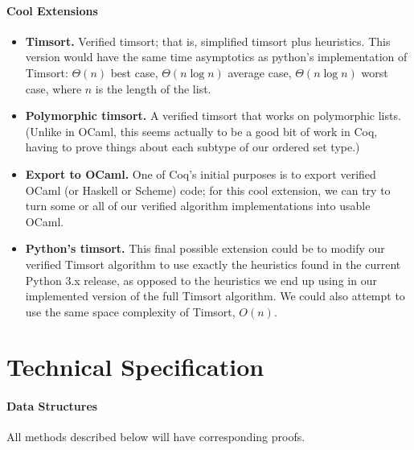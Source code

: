 \documentclass{article}
\begin{document}
\paragraph{Cool Extensions}
\begin{itemize}
  \item \textbf{Timsort.}
    Verified timsort; that is, simplified timsort plus heuristics.
    This version would have the same time asymptotics as python's
    implementation of Timsort:
    $\Theta(n)$ best case,
    $\Theta(n \log n)$ average case,
    $\Theta(n \log n)$ worst case,
    where $n$ is the length of the list.

  \item \textbf{Polymorphic timsort.}
    A verified timsort that works on polymorphic lists. (Unlike in OCaml,
    this seems actually to be a good bit of work in Coq, having to prove
    things about each subtype of our ordered set type.)

  \item \textbf{Export to OCaml.}
    One of Coq's initial purposes is to export verified OCaml (or Haskell
    or Scheme) code; for this cool extension, we can try to turn some or all
    of our verified algorithm implementations into usable OCaml.

  \item \textbf{Python's timsort.}
    This final possible extension could be to modify our verified Timsort
    algorithm to use exactly the heuristics found in the current Python 3.x
    release, as opposed to the heuristics we end up using in our implemented
    version of the full Timsort algorithm.
    We could also attempt to use the same space complexity of
    Timsort, $O(n)$.
\end{itemize}


\section{Technical Specification}
\paragraph{Data Structures}
All methods described below will have corresponding proofs.
\end{document}
